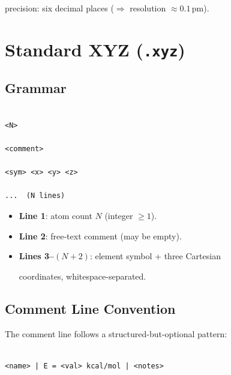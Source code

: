 \documentclass[12pt, a4paper, oneside]{article}
\begin{document}
precision: six decimal places ($\Rightarrow$ resolution $\approx 0.1$\,pm).



\section{Standard XYZ (\texttt{.xyz})}

\label{sec:xyz}



\subsection{Grammar}


\begin{lstlisting}[language={},frame=single]

<N>

<comment>

<sym> <x> <y> <z>

...  (N lines)

\end{lstlisting}


\begin{itemize}

  \item \textbf{Line 1}: atom count $N$ (integer $\ge 1$).

  \item \textbf{Line 2}: free-text comment (may be empty).

  \item \textbf{Lines 3--$(N{+}2)$}: element symbol + three Cartesian

        coordinates, whitespace-separated.

\end{itemize}


\subsection{Comment Line Convention}


The comment line follows a structured-but-optional pattern:


\begin{lstlisting}[language={},frame=single]

<name> | E = <val> kcal/mol | <notes>

\end{lstlisting}
\end{document}
